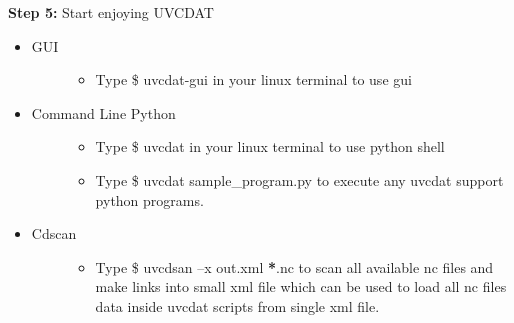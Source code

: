 \documentclass[letterpaper,10pt,english]{sphinxmanual}
\begin{document}
\textbf{Step 5:} Start enjoying UVCDAT
\begin{itemize}
\item {} \begin{description}
\item[{GUI}] \leavevmode\begin{itemize}
\item {} 
Type  \$ uvcdat-gui  in your linux terminal to use gui

\end{itemize}

\end{description}

\item {} \begin{description}
\item[{Command Line Python}] \leavevmode\begin{itemize}
\item {} 
Type \$ uvcdat  in your linux terminal to use python shell

\item {} 
Type \$ uvcdat  sample\_program.py to execute any uvcdat support python programs.

\end{itemize}

\end{description}

\item {} \begin{description}
\item[{Cdscan}] \leavevmode\begin{itemize}
\item {} 
Type \$ uvcdsan  –x out.xml {\color{red}\bfseries{}*}.nc  to scan all available nc files and make links into small xml file which can be used to load all nc files data inside uvcdat scripts from single xml file.

\end{itemize}

\end{description}

\end{itemize}
\end{document}
